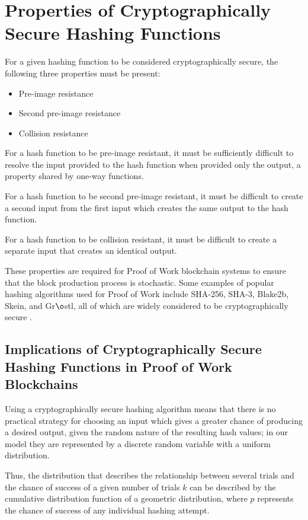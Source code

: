 \documentclass[]{article}
\begin{document}
\section{Properties of Cryptographically Secure Hashing Functions}
For a given hashing function to be considered cryptographically secure, the following three properties \cite{CryptoHashFunctions} must be present: 
\begin{itemize}
	\item Pre-image resistance
	\item Second pre-image resistance
	\item Collision resistance
\end{itemize}

For a hash function to be pre-image resistant, it must be sufficiently difficult to resolve the input provided to the hash function when provided only the output, a property shared by one-way functions.   
\newline 

For a hash function to be second pre-image resistant, it must be difficult to create a second input from the first input which creates the same output to the hash function. 
\newline

For a hash function to be collision resistant, it must be difficult to create a separate input that creates an identical output. 
\newline

These properties are required for Proof of Work blockchain systems to ensure that the block production process is stochastic.  Some examples of popular hashing algorithms used for Proof of Work include SHA-256, SHA-3, Blake2b, Skein, and Gr$\o$stl, all of which are widely considered to be cryptographically secure \cite{CryptoAlgos}. 

\subsection{Implications of Cryptographically Secure Hashing Functions in Proof of Work Blockchains}
Using a cryptographically secure hashing algorithm means that there is no practical strategy for choosing an input which gives a greater chance of producing a desired output, given the random nature of the resulting hash values; in our model they are represented by a discrete random variable with a uniform distribution.  
\newline

Thus, the distribution that describes the relationship between several trials and the chance of success of a given number of trials $k$ can be described by the cumulative distribution function of a geometric distribution, where $p$ represents the chance of success of any individual hashing attempt.   
\end{document}
